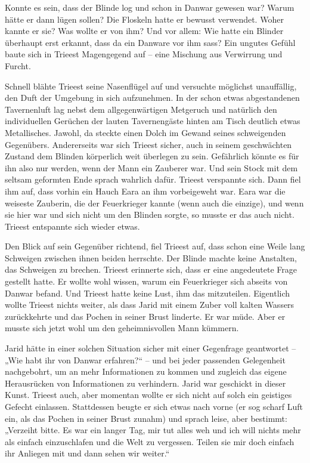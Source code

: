 Konnte es sein, dass der Blinde log und schon in Danwar gewesen war? Warum hätte er dann lügen sollen? Die Floskeln hatte er bewusst verwendet. Woher kannte er sie? Was wollte er von ihm? Und vor allem: Wie hatte ein Blinder überhaupt erst erkannt, dass da ein Danware vor ihm sass? Ein ungutes Gefühl baute sich in Trieest Magengegend auf – eine Mischung aus Verwirrung und Furcht.

Schnell blähte Trieest seine Nasenflügel auf und versuchte möglichst unauffällig, den Duft der Umgebung in sich aufzunehmen. In der schon etwas abgestandenen Tavernenluft lag nebst dem allgegenwärtigen Metgeruch und natürlich den individuellen Gerüchen der lauten Tavernengäste hinten am Tisch deutlich etwas Metallisches. Jawohl, da steckte einen Dolch im Gewand seines schweigenden Gegenübers. Andererseits war sich Trieest sicher, auch in seinem geschwächten Zustand dem Blinden körperlich weit überlegen zu sein. Gefährlich könnte es für ihn also nur werden, wenn der Mann ein Zauberer war. Und sein Stock mit dem seltsam geformten Ende sprach wahrlich dafür. Trieest verspannte sich. Dann fiel ihm auf, dass vorhin ein Hauch Eara an ihm vorbeigeweht war. Eara war die weiseste Zauberin, die der Feuerkrieger kannte (wenn auch die einzige), und wenn sie hier war und sich nicht um den Blinden sorgte, so musste er das auch nicht. Trieest entspannte sich wieder etwas.\bigskip



Den Blick auf sein Gegenüber richtend, fiel Trieest auf, dass schon eine Weile lang Schweigen zwischen ihnen beiden herrschte. Der Blinde machte keine Anstalten, das Schweigen zu brechen. Trieest erinnerte sich, dass er eine angedeutete Frage gestellt hatte. Er wollte wohl wissen, warum ein Feuerkrieger sich abseits von Danwar befand. Und Trieest hatte keine Lust, ihm das mitzuteilen. Eigentlich wollte Trieest nichts weiter, als dass Jarid mit einem Zuber voll kalten Wassers zurückkehrte und das Pochen in seiner Brust linderte. Er war müde. Aber er musste sich jetzt wohl um den geheimnisvollen Mann kümmern.

Jarid hätte in einer solchen Situation sicher mit einer Gegenfrage geantwortet – „Wie habt ihr von Danwar erfahren?“ – und bei jeder passenden Gelegenheit nachgebohrt, um an mehr Informationen zu kommen und zugleich das eigene Herausrücken von Informationen zu verhindern. Jarid war geschickt in dieser Kunst. Trieest auch, aber momentan wollte er sich nicht auf solch ein geistiges Gefecht einlassen. Stattdessen beugte er sich etwas nach vorne (er sog scharf Luft ein, als das Pochen in seiner Brust zunahm) und sprach leise, aber bestimmt: „Verzeiht bitte. Es war ein langer Tag, mir tut alles weh und ich will nichts mehr als einfach einzuschlafen und die Welt zu vergessen. Teilen sie mir doch einfach ihr Anliegen mit und dann sehen wir weiter.“

